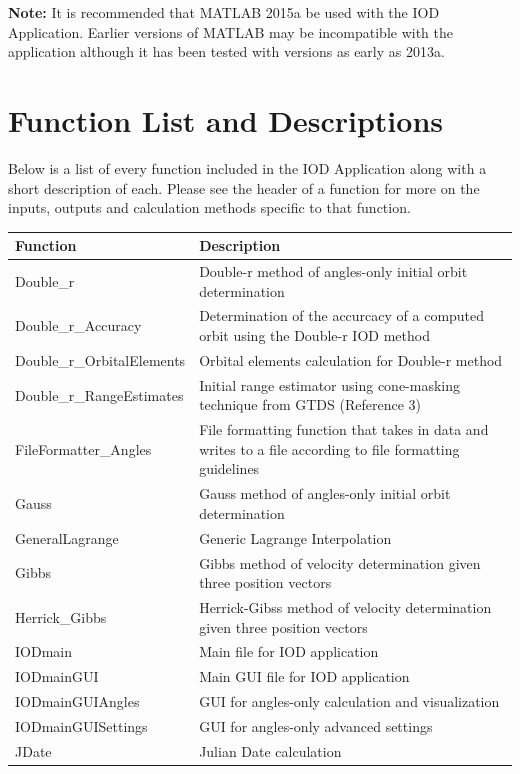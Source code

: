 \documentclass{article}
\begin{document}
			\textbf{Note:} It is recommended that MATLAB 2015a be used with the IOD Application. Earlier versions of MATLAB may be incompatible with the application although it has been tested with versions as early as 2013a. 
	\newpage
	\section{Function List and Descriptions}
   		Below is a list of every function included in the IOD Application along with a short description of each. Please see the header of a function for more on the inputs, outputs and calculation methods
		specific to that function.
		\begin{center}
		\begin{tabular}{|p{4cm}| p{9.4cm}|}	
			\hline
			\sc \textbf{Function} & \sc \textbf{Description} \\ \hline
			Double\_r & Double-r method of angles-only initial orbit determination\\ \hline
			Double\_r\_Accuracy & Determination of the accurcacy of a computed orbit using the Double-r IOD method\\ \hline
			Double\_r\_OrbitalElements & Orbital elements calculation for Double-r method\\ \hline
			Double\_r\_RangeEstimates & Initial range estimator using cone-masking technique from GTDS (Reference 3)\\ \hline
			FileFormatter\_Angles & File formatting function that takes in data and writes to a file according to file formatting guidelines\\ \hline
			Gauss & Gauss method of angles-only initial orbit determination\\ \hline
			GeneralLagrange & Generic Lagrange Interpolation\\ \hline
			Gibbs & Gibbs method of velocity determination given three position vectors\\ \hline
			Herrick\_Gibbs & Herrick-Gibss method of velocity determination given three position vectors\\ \hline
			IODmain & Main file for IOD application\\ \hline
			IODmainGUI & Main GUI file for IOD application\\ \hline
			IODmainGUIAngles & GUI for angles-only calculation and visualization\\ \hline
			IODmainGUISettings & GUI for angles-only advanced settings\\ \hline
			JDate & Julian Date calculation\\ \hline

\end{tabular}
\end{center}
\end{document}
